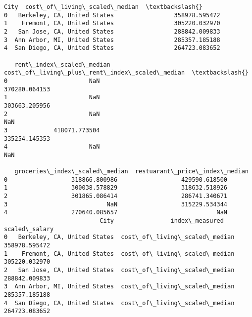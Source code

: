 \documentclass[11pt]{article}
\begin{document}
    \begin{Verbatim}[commandchars=\\\{\}]
                           City  cost\_of\_living\_scaled\_median  \textbackslash{}
0   Berkeley, CA, United States                 358978.595472
1    Fremont, CA, United States                 305220.032970
2   San Jose, CA, United States                 288842.009833
3  Ann Arbor, MI, United States                 285357.185188
4  San Diego, CA, United States                 264723.083652

   rent\_index\_scaled\_median  cost\_of\_living\_plus\_rent\_index\_scaled\_median  \textbackslash{}
0                       NaN                                 370280.064153
1                       NaN                                 303663.205956
2                       NaN                                           NaN
3             418071.773504                                 335254.145353
4                       NaN                                           NaN

   groceries\_index\_scaled\_median  restuarant\_price\_index\_median
0                  318866.800986                  429590.618500
1                  300038.578829                  318632.518926
2                  301865.086414                  286741.340671
3                            NaN                  315229.534344
4                  270640.085657                            NaN
                           City                index\_measured  scaled\_salary
0   Berkeley, CA, United States  cost\_of\_living\_scaled\_median  358978.595472
1    Fremont, CA, United States  cost\_of\_living\_scaled\_median  305220.032970
2   San Jose, CA, United States  cost\_of\_living\_scaled\_median  288842.009833
3  Ann Arbor, MI, United States  cost\_of\_living\_scaled\_median  285357.185188
4  San Diego, CA, United States  cost\_of\_living\_scaled\_median  264723.083652
    \end{Verbatim}

    \begin{center}
    \end{center}
    { \hspace*{\fill} \\}
    
\end{document}
